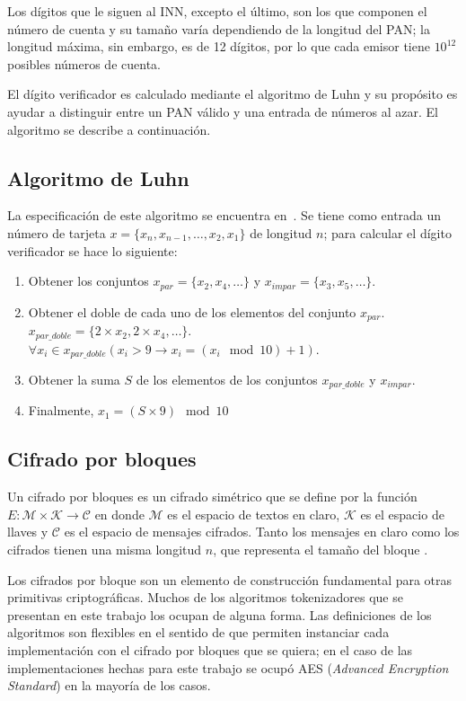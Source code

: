 Los dígitos que le siguen al INN, excepto el último, son los que componen el
número de cuenta y su tamaño varía dependiendo de la longitud del PAN; la
longitud máxima, sin embargo, es de 12 dígitos, por lo que cada emisor tiene
$10^{12}$ posibles números de cuenta.

El dígito verificador es calculado mediante el algoritmo de Luhn y su
propósito es ayudar a distinguir entre un PAN válido y una entrada de números
al azar. El algoritmo se describe a continuación.

\subsection{Algoritmo de Luhn}

La especificación de este algoritmo se encuentra en~\cite{iso_7812}. Se tiene
como entrada un número de tarjeta $ x = \{x_n, x_{n-1}, \dots, x_2, x_1\}$ de
longitud $ n $; para calcular el dígito verificador se hace lo siguiente:
\begin{enumerate}
  \item Obtener los conjuntos $x_{par} = \{x_2, x_4, \dots\}$ y
    $x_{impar} = \{x_3, x_5, \dots\}$.
  \item Obtener el doble de cada uno de los elementos del conjunto $x_{par}$.
    $x_{par\_doble} = \{2 \times x_2, 2 \times x_4, \dots\}$.
    $\forall x_i \in x_{par\_doble} (x_i > 9 \rightarrow
    x_i = (x_i \mod 10) + 1)$.
  \item Obtener la suma $ S $ de los elementos de los conjuntos $x_{par\_doble}$
    y $x_{impar}$.
  \item Finalmente, $x_1 = (S \times 9) \mod 10$
\end{enumerate}

\subsection{Cifrado por bloques}

Un cifrado por bloques es un cifrado simétrico que se define por la función $ E:
\mathcal{M} \times \mathcal{K} \rightarrow \mathcal{C} $ en donde $ \mathcal{M} $
es el espacio de textos en claro, $ \mathcal{K} $ es el espacio de llaves y $
\mathcal{C} $ es el espacio de mensajes cifrados. Tanto los mensajes en claro
como los cifrados tienen una misma longitud $ n $, que representa el tamaño del
bloque \cite{menezes}.

Los cifrados por bloque son un elemento de construcción fundamental para otras
primitivas criptográficas. Muchos de los algoritmos tokenizadores que se
presentan en este trabajo los ocupan de alguna forma. Las definiciones de los
algoritmos son flexibles en el sentido de que permiten instanciar cada
implementación con el cifrado por bloques que se quiera; en el caso de las
implementaciones hechas para este trabajo se ocupó AES (\textit{Advanced
Encryption Standard}) en la mayoría de los casos.

